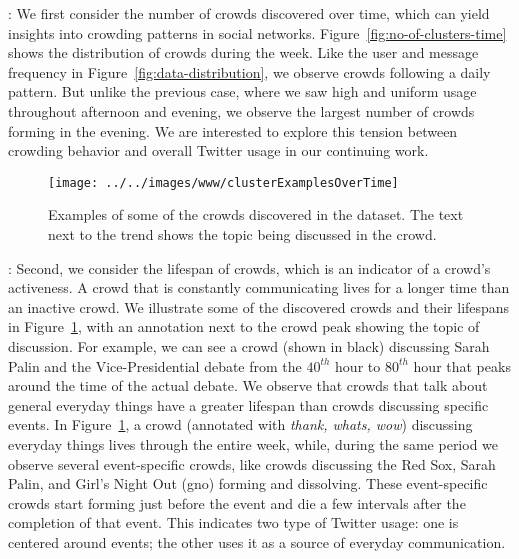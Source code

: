 \documentclass{sig-alternate}
\begin{document}
\medskip{}: We first consider the number
of crowds discovered over time, which can yield insights into crowding patterns
in social networks. Figure~\ref{fig:no-of-clusters-time} shows the distribution
of crowds during the week. Like the user and message frequency in
Figure~\ref{fig:data-distribution}, we observe crowds following a daily pattern.
But unlike the previous case, where we saw high and uniform usage throughout
afternoon and evening, we observe the largest number of crowds forming in the
evening. We are interested to explore this tension between crowding behavior and
overall Twitter usage in our continuing work.


\begin{figure}[!t]
\begin{center}
\texttt{[image: ../../images/www/clusterExamplesOverTime]}
\caption{Examples of some of the crowds discovered in the dataset. The text
next to the trend shows the topic being discussed in the crowd.}
\label{fig:cluster-example}
\end{center}
\end{figure}

\medskip{}: Second, we consider the lifespan of crowds,
which is an indicator of a crowd's activeness. A crowd that is constantly
communicating lives for a longer time than an inactive crowd. We illustrate some
of the discovered crowds and their lifespans in Figure~\ref{fig:cluster-example},
with an annotation next to the crowd peak showing the topic of discussion. For
example, we can see a crowd (shown in black) discussing Sarah Palin and the
Vice-Presidential debate from the $40^{th}$ hour to $80^{th}$ hour that peaks
around the time of the actual debate. We observe that crowds that talk about
general everyday things have a greater lifespan than crowds discussing specific
events. In Figure~\ref{fig:cluster-example}, a crowd (annotated with
\textit{thank, whats, wow}) discussing everyday things lives through the entire
week, while, during the same period we observe several event-specific crowds,
like crowds discussing the Red Sox, Sarah Palin, and Girl's Night Out (gno)
forming and dissolving. These event-specific crowds start forming just before the
event and die a few intervals after the completion of that event. This indicates
two type of Twitter usage: one is centered around events; the other uses it as a
source of everyday communication.
\end{document}
